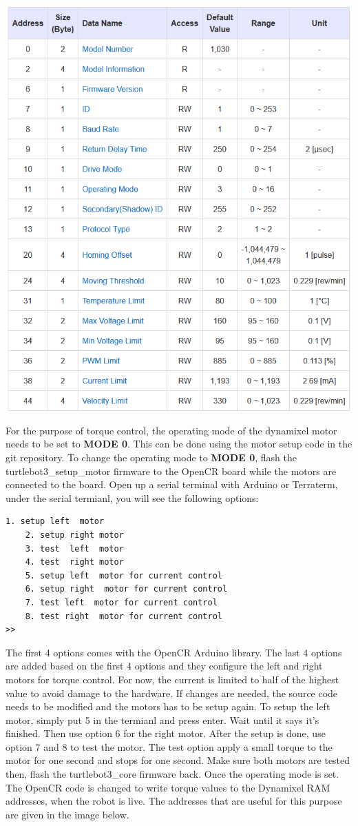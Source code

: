 \documentclass[12]{article}
\begin{document}
\begin{center}
	\includegraphics[width=0.7\linewidth]{images/dxl_eeprom.png}\\
\end{center}

For the purpose of torque control, the operating mode of the dynamixel motor needs to be set to \textbf{MODE 0}. This can be done using the motor setup code in the git repository.
To change the operating mode to \textbf{MODE 0}, flash the turtlebot3\_setup\_motor firmware to the OpenCR board while the motors are connected to the board. 
Open up a serial terminal with Arduino or Terraterm, under the serial termianl, you will see the following options:
\begin{lstlisting}[style=bash]
    1. setup left  motor
    2. setup right motor
    3. test  left  motor
    4. test  right motor
    5. setup left  motor for current control
    6. setup right  motor for current control
    7. test left  motor for current control
    8. test right  motor for current control
>> 
\end{lstlisting}
The first 4 options comes with the OpenCR Arduino library. The last 4 options are added based on the first 4 options and they configure the left and right motors for torque control.
For now, the current is limited to half of the highest value to avoid damage to the hardware. If changes are needed, the source code needs to be modified and the motors has to be setup again. 
To setup the left motor, simply put 5 in the termianl and press enter. Wait until it says it's finished. Then use option 6 for the right motor.
After the setup is done, use option 7 and 8 to test the motor. The test option apply a small torque to the motor for one second and stops for one second. Make sure both motors are tested then, flash the turtlebot3\_core firmware back.
Once the operating mode is set. The OpenCR code is changed to write torque values to the Dynamixel RAM addresses, when the robot is live. The addresses that are useful for this purpose are given in the image below.
\end{document}

